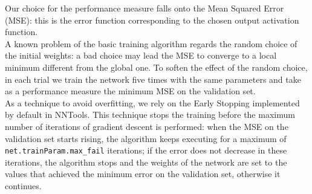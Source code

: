 \documentclass{article}
\begin{document}
Our choice for the performance measure falls onto the Mean Squared Error (MSE): this is the error function corresponding to the chosen output activation function.\\
A known problem of the basic training algorithm regards the random choice of the initial weights: a bad choice may lead the MSE to converge to a local minimum different from the global one. To soften the effect of the random choice, in each trial we train the network five times with the same parameters and take as a performance measure the minimum MSE on the validation set.\\
As a technique to avoid overfitting, we rely on the Early Stopping implemented by default in NNTools. This technique stops the training before the maximum number of iterations of gradient descent is performed: when the MSE on the validation set starts rising, the algorithm keeps executing for a maximum of \verb$net.trainParam.max_fail$ iterations; if the error does not decrease in these iterations, the algorithm stops and the weights of the network are set to the values that achieved the minimum error on the validation set, otherwise it continues.\\
\end{document}
